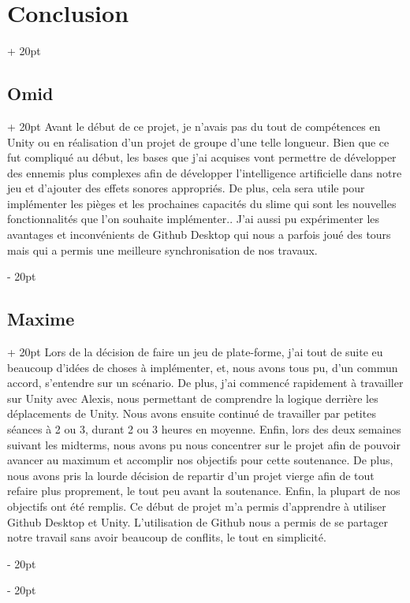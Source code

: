 \documentclass[a4paper, 12pt, twoside]{article}
\newcommand{\ind}[1][20pt]{\advance\leftskip + #1}
\newcommand{\deind}[1][20pt]{\advance\leftskip - #1}
\newenvironment{indt}[2][20pt]{#2 \par \ind[#1]}{\par \deind} %
\begin{document}
\begin{indt}{\section{Conclusion}}
        \begin{indt}{\subsection{Omid}}
            Avant le début de ce projet, je n'avais pas du tout de compétences en Unity ou en réalisation d'un projet de groupe d'une telle longueur. Bien que ce fut compliqué au début, les bases que j'ai acquises vont permettre de développer des ennemis plus complexes afin de développer l'intelligence artificielle dans notre jeu et d'ajouter des effets sonores appropriés. De plus, cela sera utile pour implémenter les pièges et les prochaines capacités du slime qui sont les nouvelles fonctionnalités que l'on souhaite implémenter.. J'ai aussi pu expérimenter les avantages et inconvénients de Github Desktop qui nous a parfois joué des tours mais qui a permis une meilleure synchronisation de nos travaux.
        \end{indt}

        \begin{indt}{\subsection{Maxime}}
            Lors de la décision de faire un jeu de plate-forme, j'ai tout de suite eu beaucoup d'idées de choses à implémenter, et, nous avons tous pu, d'un commun accord, s'entendre sur un scénario. De plus, j'ai commencé rapidement à travailler sur Unity avec Alexis, nous permettant de comprendre la logique derrière les déplacements de Unity. Nous avons ensuite continué de travailler par petites séances à 2 ou 3, durant 2 ou 3 heures en moyenne. Enfin, lors des deux semaines suivant les midterms, nous avons pu nous concentrer sur le projet afin de pouvoir avancer au maximum et accomplir nos objectifs pour cette soutenance. De plus, nous avons pris la lourde décision de repartir d'un projet vierge afin de tout refaire plus proprement, le tout peu avant la soutenance. Enfin, la plupart de nos objectifs ont été remplis. Ce début de projet m'a permis d'apprendre à utiliser Github Desktop et Unity. L'utilisation de Github nous a permis de se partager notre travail sans avoir beaucoup de conflits, le tout en simplicité.
        \end{indt}
    \end{indt}

    \newpage
\end{document}
